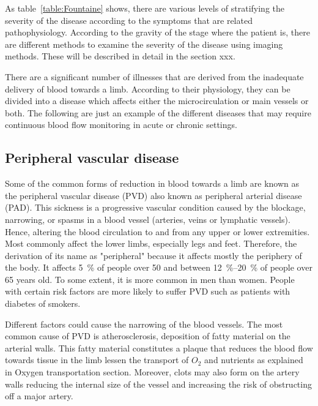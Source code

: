 As table~\ref{table:Fountaine} shows, there are various levels of stratifying the severity of the disease according to the symptoms that are related pathophysiology. According to the gravity of the stage where the patient is, there are different methods to examine the severity of the disease using imaging methods. These will be described in detail in the section xxx.


There are a significant number of illnesses that are derived from the inadequate delivery of blood towards a limb. According to their physiology, they can be divided into a disease which affects either the microcirculation or main vessels or both. The following are just an example of the different diseases that may require continuous blood flow monitoring in acute or chronic settings.



\subsection{Peripheral vascular disease}
\label{section literature 2.1}
Some of the common forms of reduction in blood towards a limb are known as the peripheral vascular disease (PVD) also known as peripheral arterial disease (PAD). This sickness is a progressive vascular condition caused by the blockage, narrowing, or spasms in a blood vessel (arteries, veins or lymphatic vessels). Hence, altering the blood circulation to and from any upper or lower extremities.  Most commonly affect the lower limbs, especially legs and feet. Therefore, the derivation of its name as "peripheral" because it affects mostly the periphery of the body. It affects \SI{5}{\percent} of people over \num{50} and between \SIrange{12}{20}{\percent} of people over 65 years old. To some extent, it is more common in men than women. People with certain risk factors are more likely to suffer PVD such as patients with diabetes of smokers.  


Different factors could cause the narrowing of the blood vessels. The most common cause of PVD is atherosclerosis, deposition of fatty material on the arterial walls. This fatty material constitutes a plaque that reduces the blood flow towards tissue in the limb lessen the transport of $O_2$ and nutrients as explained in Oxygen transportation section. Moreover, clots may also form on the artery walls reducing the internal size of the vessel and increasing the risk of obstructing off a major artery. 

